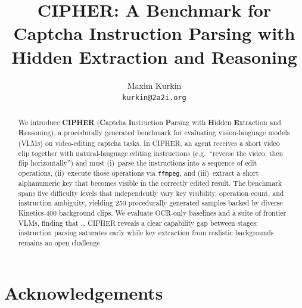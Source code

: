 \documentclass{article}
\title{CIPHER: A Benchmark for Captcha Instruction Parsing with Hidden Extraction and Reasoning}
\author{%
  Maxim Kurkin \\
  \texttt{kurkin@2a2i.org}
}
\begin{document}
\maketitle

\begin{abstract}
We introduce \textbf{CIPHER} (\textbf{C}aptcha \textbf{I}nstruction \textbf{P}arsing with
\textbf{H}idden \textbf{E}xtraction and \textbf{R}easoning), a procedurally generated benchmark
for evaluating vision-language models (VLMs) on video-editing captcha tasks.
In CIPHER, an agent receives a short video clip together with natural-language editing
instructions (e.g.\ ``reverse the video, then flip horizontally'') and must
(i)~parse the instructions into a sequence of edit operations,
(ii)~execute those operations via \texttt{ffmpeg}, and
(iii)~extract a short alphanumeric key that becomes visible in the correctly edited result.
The benchmark spans five difficulty levels that independently vary key visibility,
operation count, and instruction ambiguity, yielding \num{250} procedurally generated samples
backed by diverse Kinetics-400 background clips.
We evaluate OCR-only baselines and a suite of frontier VLMs, finding that
\ldots %
CIPHER reveals a clear capability gap between stages: instruction parsing saturates early
while key extraction from realistic backgrounds remains an open challenge.
\end{abstract}








\section*{Acknowledgements}



\end{document}
